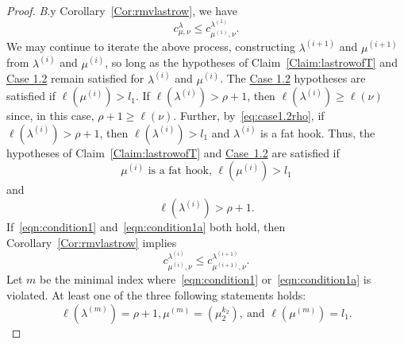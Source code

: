 \documentclass[10pt]{article}
\theoremstyle{definition}
\let\hyperlinka\hyperlink %
\newenvironment{Case}[1]{\par\vskip2pt\noindent%
\emph{#1}.}{\vskip2pt}
\begin{document}
\begin{proof}
\begin{Case}
By Corollary~\ref{Cor:rmvlastrow}, we have
\begin{equation}
\label{eq:firstiterationbound}
c^{\lambda}_{\mu,\nu} \leq c^{\lambda^{(1)}}_{\mu^{(1)},\nu}.
\end{equation}
We may continue to iterate the above process, constructing $\lambda^{(i+1)}$ and $\mu^{(i+1)}$ from $\lambda^{(i)}$ and $\mu^{(i)}$, so long as the hypotheses of Claim~\ref{Claim:lastrowofT} and %
\hyperlinka{theo4.6_case1.2}{Case 1.2} remain satisfied for $\lambda^{(i)}$ and $\mu^{(i)}$. The \hyperlinka{theo4.6_case1.2}{Case 1.2} hypotheses are satisfied if $\ell(\mu^{(i)}) > l_1$. If $\ell(\lambda^{(i)}) > \rho + 1$, then $\ell(\lambda^{(i)}) \geq \ell(\nu)$ since, in this case, $\rho + 1 \geq \ell(\nu)$. Further, by~\eqref{eq:case1.2rho}, if $\ell(\lambda^{(i)}) > \rho + 1$, then $\ell(\lambda^{(i)}) > l_1$ and $\lambda^{(i)}$ is a fat hook. Thus, the hypotheses of Claim~\ref{Claim:lastrowofT} and \hyperlinka{theo4.6_case1.2}{Case~1.2} are satisfied if 
\begin{equation}\label{eqn:condition1}
 \mu^{(i)}\text{ is a fat hook, }\ell(\mu^{(i)}) > l_1
\end{equation}
and 
\begin{equation}\label{eqn:condition1a}
 \ell(\lambda^{(i)}) > \rho+1 .
\end{equation}
If~\eqref{eqn:condition1} and~\eqref{eqn:condition1a} both hold, then Corollary~\ref{Cor:rmvlastrow} implies
\begin{equation}\label{eqn:increase}
 c^{\lambda^{(i)}}_{\mu^{(i)},\nu} \leq c^{\lambda^{(i+1)}}_{\mu^{(i+1)},\nu}.
\end{equation}
Let $m$ be the minimal index where~\eqref{eqn:condition1} or~\eqref{eqn:condition1a} is violated. At least one of the three following statements holds: 
\[
\ell(\lambda^{(m)}) = \rho+1, \mu^{(m)} = (\mu_2^{k_2}),\ \text{and } \ell(\mu^{(m)}) = l_1.
\]


\end{Case}
\end{proof}
\end{document}
